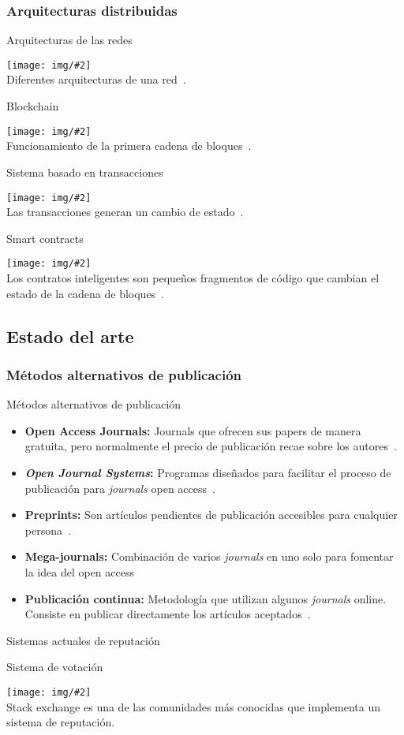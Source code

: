 \documentclass{beamer}
\newcommand{\ib}[1]{\item \textbf{#1} }
\newcommand{\framei}[4]{
  \begin{frame}{#1}
    \begin{center}
      \texttt{[image: img/\#2]}\\
      #3~\cite{#4}.
    \end{center}
  \end{frame}
}
\newcommand{\framein}[3]{
  \begin{frame}{#1}
    \begin{center}
      \texttt{[image: img/\#2]}\\
      #3.
    \end{center}
  \end{frame}
}
\newcommand{\framet}[3]{
  \begin{frame}{#1}
    #2
  \end{frame}
}
\begin{document}
\subsubsection{Arquitecturas distribuidas}
\framei{Arquitecturas de las redes}{architectures.png}{Diferentes arquitecturas de una red}{baran1964distributed}

\framei{Blockchain}{blockchain.png}{Funcionamiento de la primera cadena de bloques}{nakamoto2008bitcoin}

\framei{Sistema basado en transacciones}{transaction.png}{Las transacciones generan un cambio de estado}{antonopoulos2014mastering}

\framei{Smart contracts}{sc.png}{Los contratos inteligentes son
  pequeños fragmentos de código que cambian el estado de la cadena de bloques}{buterin2014ethereum}

\subsection{Estado del arte}
\subsubsection{Métodos alternativos de publicación}
\framet{Métodos alternativos de publicación}{
  \begin{itemize}
    \ib{Open Access Journals:} Journals que ofrecen sus papers de manera
    gratuita, pero normalmente el precio de publicación recae sobre los autores~\cite{solomon2012study}.
    \ib{\emph{Open Journal Systems}:} Programas diseñados para facilitar el
    proceso de publicación para \textit{journals} open access~\cite{willinsky2005open}.
    \ib{Preprints:} Son artículos pendientes de publicación accesibles
    para cualquier persona~\cite{shuai2012scientific}.
    \ib{Mega-journals:} Combinación de varios \emph{journals} en uno solo para
    fomentar la idea del open access~\cite{binfield2013open}
    \ib{Publicación continua:} Metodología que utilizan algunos
      \emph{journals} online. Consiste en publicar directamente los artículos
      aceptados~\cite{anderton2013continuous}.
  \end{itemize}
}

\subsubsection{Sistemas actuales de reputación}
\framein{Sistema de votación}{se.png}{Stack exchange es una de las comunidades más
  conocidas que implementa un sistema de reputación}
\end{document}
